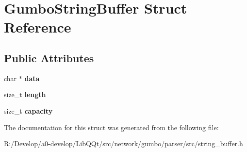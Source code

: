 \hypertarget{struct_gumbo_string_buffer}{}\section{Gumbo\+String\+Buffer Struct Reference}
\label{struct_gumbo_string_buffer}
\subsection*{Public Attributes}
\begin{DoxyCompactItemize}
\item 
\mbox{\label{struct_gumbo_string_buffer_ac52ed2e0e0657153b5c1c48294b21819}} 
char $\ast$ {\bfseries data}
\item 
\mbox{\label{struct_gumbo_string_buffer_a4280da9d60cb387ebe10ff38fbb32382}} 
size\+\_\+t {\bfseries length}
\item 
\mbox{\label{struct_gumbo_string_buffer_a6d52140d514560ebc399bd0d15f460f4}} 
size\+\_\+t {\bfseries capacity}
\end{DoxyCompactItemize}


The documentation for this struct was generated from the following file\+:\begin{DoxyCompactItemize}
\item 
R\+:/\+Develop/a0-\/develop/\+Lib\+Q\+Qt/src/network/gumbo/parser/src/string\+\_\+buffer.\+h\end{DoxyCompactItemize}
